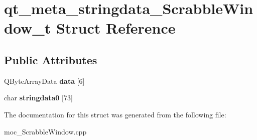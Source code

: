 \hypertarget{structqt__meta__stringdata__ScrabbleWindow__t}{}\section{qt\+\_\+meta\+\_\+stringdata\+\_\+\+Scrabble\+Window\+\_\+t Struct Reference}
\label{structqt__meta__stringdata__ScrabbleWindow__t}
\subsection*{Public Attributes}
\begin{DoxyCompactItemize}
\item 
\mbox{\label{structqt__meta__stringdata__ScrabbleWindow__t_a7644e0cbd62ecf82f8e6cdcd93591ab2}} 
Q\+Byte\+Array\+Data {\bfseries data} \mbox{[}6\mbox{]}
\item 
\mbox{\label{structqt__meta__stringdata__ScrabbleWindow__t_a461e2a1f900b9ad4dccb06d03a4549f3}} 
char {\bfseries stringdata0} \mbox{[}73\mbox{]}
\end{DoxyCompactItemize}


The documentation for this struct was generated from the following file\+:\begin{DoxyCompactItemize}
\item 
moc\+\_\+\+Scrabble\+Window.\+cpp\end{DoxyCompactItemize}
